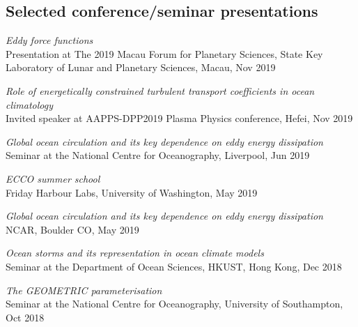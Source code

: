 \documentclass[letterpaper]{article}
\renewenvironment{itemize}{
  \begin{list}{}{
    \setlength{\leftmargin}{1.5em}
  }
}{
  \end{list}
}
\begin{document}
\subsection*{Selected conference/seminar presentations}
\begin{itemize}

\item[--] \textit{Eddy force functions}\\
Presentation at The 2019 Macau Forum for Planetary Sciences, State Key
Laboratory of Lunar and Planetary Sciences, Macau, Nov 2019

\item[--] \textit{Role of energetically constrained turbulent transport
coefficients in ocean climatology}\\
Invited speaker at AAPPS-DPP2019 Plasma Physics conference, Hefei, Nov 2019

\item[--] \textit{Global ocean circulation and its key dependence on eddy energy dissipation}\\
Seminar at the National Centre for Oceanography, Liverpool, Jun 2019

\item[--] \textit{ECCO summer school}\\
Friday Harbour Labs, University of Washington, May 2019

\item[--] \textit{Global ocean circulation and its key dependence on eddy energy dissipation}\\
NCAR, Boulder CO, May 2019

\item[--] \textit{Ocean storms and its representation in ocean climate models}\\
Seminar at the Department of Ocean Sciences, HKUST, Hong Kong, Dec 2018

\item[--] \textit{The GEOMETRIC parameterisation}\\
Seminar at the National Centre for Oceanography, University of Southampton, Oct
2018

\end{itemize}

\end{document}
